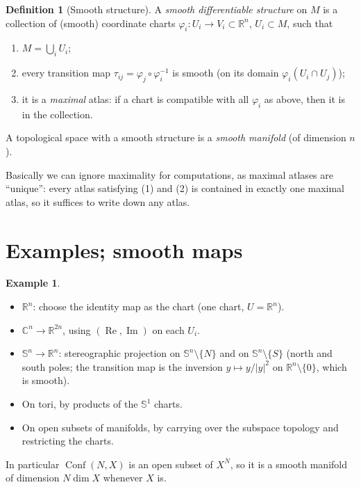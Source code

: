 \documentclass[11pt,openany]{book}
\theoremstyle{plain}
\theoremstyle{definition}
\newtheorem{definition}[theorem]{Definition}
\newtheorem{example}[theorem]{Example}
\theoremstyle{remark}
\newcommand{\added}[1]{{\color{addcol}#1}}
\newcommand{\R}{\mathbb{R}}
\newcommand{\C}{\mathbb{C}}
\newcommand{\Sph}{\mathbb{S}}          %
\newcommand{\Conf}{\operatorname{Conf}}
\newcommand{\abs}[1]{\left\lvert #1 \right\rvert}
\begin{document}
\begin{definition}[Smooth structure]
\label{L07:def:smoothstructure}
A \emph{smooth differentiable structure} on $M$ is a collection of (smooth) coordinate
charts $\varphi_i\colon U_i\to V_i\subset\R^n$, $U_i\subset M$, such that
\begin{enumerate}
  \item $M=\bigcup_i U_i$;
  \item every transition map $\tau_{ij}=\varphi_j\circ\varphi_i^{-1}$ is smooth
    \added{(on its domain $\varphi_i(U_i\cap U_j)$)};
  \item it is a \emph{maximal} atlas: if a chart is compatible with all $\varphi_i$ as
    above, then it is in the collection.
\end{enumerate}
A topological space with a smooth structure is a \emph{smooth manifold} (of dimension $n$).
\end{definition}

Basically we can ignore maximality for computations, as maximal atlases are ``unique'':
\added{every atlas satisfying (1) and (2) is contained in exactly one maximal atlas, so it
suffices to write down any atlas.}

\section{Examples; smooth maps}
\label{L07:sec:examples}

\begin{example}
\label{L07:ex:manifolds}
\leavevmode
\begin{itemize}
  \item $\R^n$: choose the identity map as the chart \added{(one chart, $U=\R^n$)}.
  \item $\C^n\to\R^{2n}$, using $(\operatorname{Re},\operatorname{Im})$ on each $U_i$.
  \item $\Sph^n\to\R^n$: stereographic projection on $\Sph^n\setminus\{N\}$ and on
    $\Sph^n\setminus\{S\}$ \added{(north and south poles; the transition map is the
    inversion $y\mapsto y/\abs{y}^2$ on $\R^n\setminus\{0\}$, which is smooth)}.
  \item On tori, by products of the $\Sph^1$ charts.
  \item On open subsets of manifolds, by carrying over the subspace topology
    \added{and restricting the charts}.
\end{itemize}
\added{In particular $\Conf(N,X)$ is an open subset of $X^N$, so it is a smooth manifold of
dimension $N\dim X$ whenever $X$ is.}
\end{example}
\end{document}
